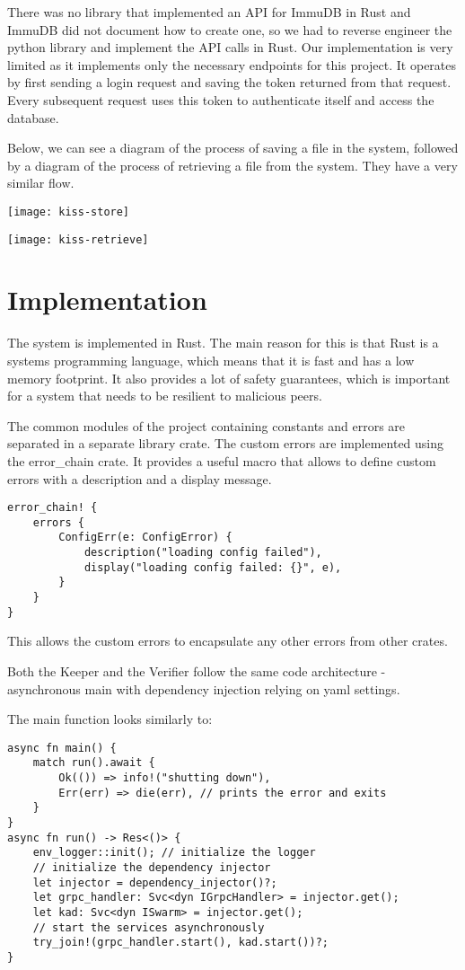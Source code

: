 \documentclass[ twoside,openright,titlepage,numbers=noenddot,headinclude,%
                footinclude=true,cleardoublepage=empty,abstractoff, %
                BCOR=5mm,paper=a4,fontsize=11pt,%
                ngerman,american,%
                ]{scrreprt}
\begin{document}
There was no library that implemented an API for ImmuDB in Rust and ImmuDB did not document how to create one,
so we had to reverse engineer the python library and implement the API calls in Rust.
Our implementation is very limited as it implements only the necessary endpoints for this project.
It operates by first sending a login request and saving the token returned from that request.
Every subsequent request uses this token to authenticate itself and access the database.

Below, we can see a diagram of the process of saving a file in the system,
followed by a diagram of the process of retrieving a file from the system.
They have a very similar flow.

\texttt{[image: kiss-store]}

\texttt{[image: kiss-retrieve]}


\section{Implementation}
\label{sec:implementation}

The system is implemented in Rust.
The main reason for this is that Rust is a systems programming language,
which means that it is fast and has a low memory footprint.
It also provides a lot of safety guarantees,
which is important for a system that needs to be resilient to malicious peers.

The common modules of the project containing constants and errors are separated in a separate library crate.
The custom errors are implemented using the error\_chain crate.
It provides a useful macro that allows to define custom errors with a description and a display message.
\begin{verbatim}
error_chain! {
    errors {
        ConfigErr(e: ConfigError) {
            description("loading config failed"),
            display("loading config failed: {}", e),
        }
    }
}
\end{verbatim}

This allows the custom errors to encapsulate any other errors from other crates.

Both the Keeper and the Verifier follow the same code architecture - asynchronous main with dependency injection
relying on yaml settings.

The main function looks similarly to:
\begin{verbatim}
async fn main() {
    match run().await {
        Ok(()) => info!("shutting down"),
        Err(err) => die(err), // prints the error and exits
    }
}
async fn run() -> Res<()> {
    env_logger::init(); // initialize the logger
    // initialize the dependency injector
    let injector = dependency_injector()?; 
    let grpc_handler: Svc<dyn IGrpcHandler> = injector.get();
    let kad: Svc<dyn ISwarm> = injector.get();
    // start the services asynchronously
    try_join!(grpc_handler.start(), kad.start())?;
}
\end{verbatim}
\end{document}
